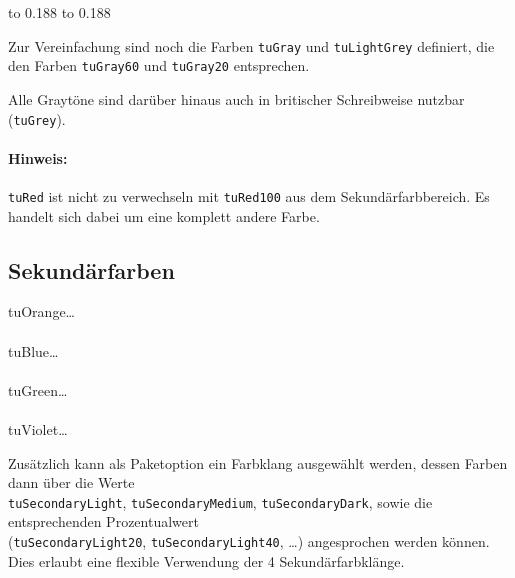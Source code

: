 {\sffamily\footnotesize%
\colorbox{tuRed}{\hbox to 0.188}%
\colorbox{tuBlack}{\hbox to 0.188}%
\\%
}


Zur Vereinfachung sind noch die Farben \lstinline{tuGray} und
\lstinline{tuLightGrey} definiert, die den Farben \lstinline{tuGray60} und
\lstinline{tuGray20} entsprechen.

Alle Graytöne sind darüber hinaus auch in britischer Schreibweise nutzbar
(\lstinline{tuGrey}).

\paragraph{Hinweis:}
\lstinline{tuRed} ist nicht zu verwechseln mit \lstinline{tuRed100} aus dem
Sekundärfarbbereich. Es handelt sich dabei um eine komplett andere Farbe.

\pagebreak
\subsection{Sekundärfarben}

  tuOrange\ldots\\
  \\[-1ex]
  tuBlue\ldots\\
  \\[-1ex]
  tuGreen\ldots\\
  \\[-1ex]
  tuViolet\ldots\\


Zusätzlich kann als Paketoption ein Farbklang ausgewählt werden, dessen Farben
dann über die Werte  \\\lstinline{tuSecondaryLight},
\lstinline{tuSecondaryMedium}, \lstinline{tuSecondaryDark}, sowie die
entsprechenden Prozentualwert \\(\lstinline{tuSecondaryLight20},
\lstinline{tuSecondaryLight40}, \ldots) angesprochen werden können.
Dies erlaubt eine flexible Verwendung der 4 Sekundärfarbklänge.

